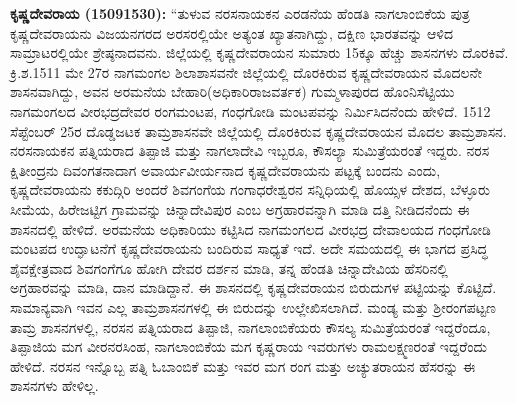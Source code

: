 \textbf{ ಕೃಷ್ಣದೇವರಾಯ (1509\general{\enginline{-}}1530):} “ತುಳುವ ನರಸನಾಯಕನ ಎರಡನೆಯ ಹೆಂಡತಿ ನಾಗಲಾಂಬಿಕೆಯ ಪುತ್ರ ಕೃಷ್ಣದೇವರಾಯನು ವಿಜಯನಗರದ ಅರಸರಲ್ಲಿಯೇ ಅತ್ಯಂತ ಖ್ಯಾತನಾಗಿದ್ದು, ದಕ್ಷಿಣ ಭಾರತವನ್ನು ಆಳಿದ ಸಾಮ್ರಾಟರಲ್ಲಿಯೇ ಶ್ರೇಷ್ಠನಾದವನು. ಜಿಲ್ಲೆಯಲ್ಲಿ ಕೃಷ್ಣದೇವರಾಯನ ಸುಮಾರು 15ಕ್ಕೂ ಹೆಚ್ಚು ಶಾಸನಗಳು ದೊರಕಿವೆ. ಕ್ರಿ.ಶ.1511 ಮೇ 27ರ ನಾಗಮಂಗಲ ಶಿಲಾಶಾಸವನೇ ಜಿಲ್ಲೆಯಲ್ಲಿ ದೊರಕಿರುವ ಕೃಷ್ಣದೇವರಾಯನ ಮೊದಲನೇ ಶಾಸನವಾಗಿದ್ದು, ಅವನ ಅರಮನೆಯ ಬೇಹಾರಿ(ಅಧಿಕಾರಿ\enginline{-}ರಾಜವರ್ತಕ) ಗುಮ್ಮಳಾಪುರದ ಹೊಂನಿಸೆಟ್ಟಿಯು ನಾಗಮಂಗಲದ ವೀರಭದ್ರದೇವರ ರಂಗಮಂಟಪ, ಗಂಧಗೋಡಿ ಮಂಟಪವನ್ನು ನಿರ್ಮಿಸಿದನೆಂದು ಹೇಳಿದೆ. 1512 ಸೆಪ್ಟೆಂಬರ್​ 25ರ ದೊಡ್ಡಜಟಕ ತಾಮ್ರಶಾಸನವೇ ಜಿಲ್ಲೆಯಲ್ಲಿ ದೊರಕಿರುವ ಕೃಷ್ಣದೇವರಾಯನ ಮೊದಲ ತಾಮ್ರಶಾಸನ. ನರಸನಾಯಕನ ಪತ್ನಿಯರಾದ ತಿಪ್ಪಾಜಿ ಮತ್ತು ನಾಗಲಾದೇವಿ ಇಬ್ಬರೂ, ಕೌಸಲ್ಯಾ ಸುಮಿತ್ರೆಯರಂತೆ ಇದ್ದರು. ನರಸ ಕ್ಷಿತೀಂದ್ರನು ದಿವಂಗತನಾದಾಗ ಅವಾರ್ಯವೀರ್ಯನಾದ ಕೃಷ್ಣದೇವರಾಯನು ಪಟ್ಟಕ್ಕೆ ಬಂದನು ಎಂದು, ಕೃಷ್ಣದೇವರಾಯನು ಕಕುದ್ಗಿರಿ ಅಂದರೆ ಶಿವಗಂಗೆಯ ಗಂಗಾಧರೇಶ್ವರನ ಸನ್ನಿಧಿಯಲ್ಲಿ ಹೊಯ್ಸಳ ದೇಶದ, ಬೆಳ್ಳೂರು ಸೀಮೆಯ, ಹಿರೇಜಟ್ಟಿಗ ಗ್ರಾಮವನ್ನು ಚಿನ್ನಾದೇವಿಪುರ ಎಂಬ ಅಗ್ರಹಾರವನ್ನಾಗಿ ಮಾಡಿ ದತ್ತಿ ನೀಡಿದನೆಂದು ಈ ಶಾಸನದಲ್ಲಿ ಹೇಳಿದೆ. ಅರಮನೆಯ ಅಧಿಕಾರಿಯು ಕಟ್ಟಿಸಿದ ನಾಗಮಂಗಲದ ವೀರಭದ್ರ ದೇವಾಲಯದ ಗಂಧಗೋಡಿ ಮಂಟಪದ ಉದ್ಘಾಟನೆಗೆ ಕೃಷ್ಣದೇವರಾಯನು ಬಂದಿರುವ ಸಾಧ್ಯತೆ ಇದೆ. ಅದೇ ಸಮಯದಲ್ಲಿ ಈ ಭಾಗದ ಪ್ರಸಿದ್ಧ ಶೈವಕ್ಷೇತ್ರವಾದ ಶಿವಗಂಗೆಗೂ ಹೋಗಿ ದೇವರ ದರ್ಶನ ಮಾಡಿ, ತನ್ನ ಹೆಂಡತಿ ಚಿನ್ನಾದೇವಿಯ ಹೆಸರಿನಲ್ಲಿ ಅಗ್ರಹಾರವನ್ನು ಮಾಡಿ, ದಾನ ಮಾಡಿದ್ದಾನೆ. ಈ ಶಾಸನದಲ್ಲಿ ಕೃಷ್ಣದೇವರಾಯನ ಬಿರುದುಗಳ ಪಟ್ಟಿಯನ್ನು ಕೊಟ್ಟಿದೆ. ಸಾಮಾನ್ಯವಾಗಿ ಇವನ ಎಲ್ಲ ತಾಮ್ರಶಾಸನಗಳಲ್ಲಿ ಈ ಬಿರುದನ್ನು ಉಲ್ಲೇಖಿಸಲಾಗಿದೆ. ಮಂಡ್ಯ ಮತ್ತು ಶ‍್ರೀರಂಗಪಟ್ಟಣ ತಾಮ್ರ ಶಾಸನಗಳಲ್ಲಿ, ನರಸನ ಪತ್ನಿಯರಾದ ತಿಪ್ಪಾಜಿ, ನಾಗಲಾಂಬಿಕೆಯರು ಕೌಸಲ್ಯ ಸುಮಿತ್ರೆಯರಂತೆ ಇದ್ದರೆಂದೂ, ತಿಪ್ಪಾಜಿಯ ಮಗ ವೀರನರಸಿಂಹ, ನಾಗಲಾಂಬಿಕೆಯ ಮಗ ಕೃಷ್ಣರಾಯ ಇವರುಗಳು ರಾಮಲಕ್ಷ್ಮಣರಂತೆ ಇದ್ದರೆಂದು ಹೇಳಿದೆ. ನರಸನ ಇನ್ನೊಬ್ಬ ಪತ್ನಿ ಓಬಾಂಬಿಕೆ ಮತ್ತು ಇವರ ಮಗ ರಂಗ ಮತ್ತು ಅಚ್ಯುತರಾಯನ ಹೆಸರನ್ನು ಈ ಶಾಸನಗಳು ಹೇಳಿಲ್ಲ.

